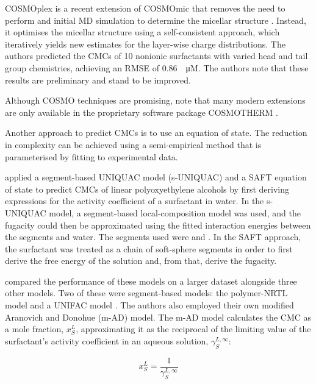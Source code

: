 COSMOplex is a recent extension of COSMOmic that removes the need to perform and
initial MD simulation to determine the micellar structure
\cite{klamtCOSMOplexSelfconsistentSimulation2019}. Instead, it optimises the
micellar structure using a self-consistent approach, which iteratively yields
new estimates for the layer-wise charge distributions. The authors predicted the
CMCs of 10 nonionic surfactants with varied head and tail group chemistries,
achieving an RMSE of \SI{0.86}{\log \micro M}. The authors note that these
results are preliminary and stand to be improved.

Although COSMO techniques are promising,
\citet{herbertDielectricContinuumMethods2021} note that many modern extensions
are only available in the proprietary software package \textsc{COSMOTHERM}
\cite{eckertFastSolventScreening2002}.

Another approach to predict CMCs is to use an equation of state. The reduction
in complexity can be achieved using a semi-empirical method that is
parameterised by fitting to experimental data.

\citet{liStudiesUNIQUACSAFT1998} applied a segment-based UNIQUAC model
(s-UNIQUAC) and a SAFT equation of state to predict CMCs of linear
polyoxyethylene alcohols by first deriving expressions for the activity
coefficient of a surfactant in water. In the s-UNIQUAC model, a segment-based
local-composition model was used, and the fugacity could then be approximated
using the fitted interaction energies between the segments and water. The
segments used were  and . In the SAFT approach, the
surfactant was treated as a chain of soft-sphere segments in order to first
derive the free energy of the solution and, from that, derive the fugacity.

\citet{chengCorrelationCriticalMicelle2005} compared the performance of these
models on a larger dataset alongside three other models. Two of these were
segment-based models: the polymer-NRTL model \cite{liStudiesUNIQUACSAFT1998} and
a UNIFAC model \cite{voutsasPredictionCriticalMicelle2001}. The authors also
employed their own modified Aranovich and Donohue (m-AD) model. The m-AD model
calculates the CMC as a mole fraction, $x_S^L$, approximating it as the
reciprocal of the limiting value of the surfactant's activity coefficient in an
aqueous solution, $\gamma_S^{L,\infty}$:

\begin{equation}
    \label{eq:m-AD}
    x_S^L = \frac{1}{\gamma_S^{L,\infty}}
\end{equation}

